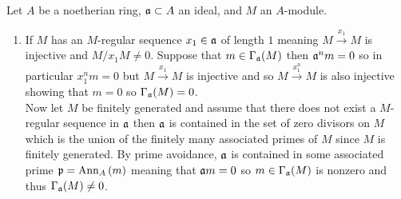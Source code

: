 \documentclass[12pt]{article}
\begin{document}
Let $A$ be a noetherian ring, $\mathfrak{a} \subset A$ an ideal, and $M$ an $A$-module. 

\begin{enumerate}
\item 
If $M$ has an $M$-regular sequence $x_1 \in \mathfrak{a}$ of length $1$ meaning $M \xrightarrow{x_1} M$ is injective and $M / x_1 M \neq 0$. Suppose that $m \in \Gamma_{\mathfrak{a}}(M)$ then $\mathfrak{a}^n m = 0$ so in particular $x_1^n m = 0$ but $M \xrightarrow{x_1} M$ is injective and so $M \xrightarrow{x_1^n} M$ is also injective showing that $m = 0$ so $\Gamma_{\mathfrak{a}}(M) = 0$. 
\bigskip\\
Now let $M$ be finitely generated and assume that there does not exist a $M$-regular sequence in $\mathfrak{a}$ then $\mathfrak{a}$ is contained in the set of zero divisors on $M$ which is the union of the finitely many associated primes of $M$ since $M$ is finitely generated. By prime avoidance, $\mathfrak{a}$ is contained in some associated prime $\mathfrak{p} = \mathrm{Ann}_{A}\left(m\right)$ meaning that $\mathfrak{a} m = 0$ so $m \in \Gamma_{\mathfrak{a}}(M)$ is nonzero and thus $\Gamma_{\mathfrak{a}}(M) \neq 0$.


\end{enumerate}
\end{document}
